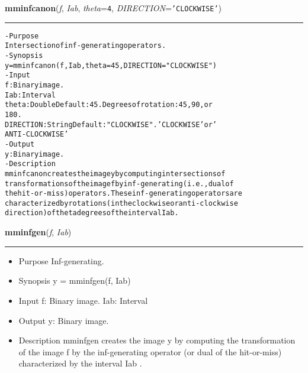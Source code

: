     \begin{boxedminipage}{\textwidth}

    \raggedright \textbf{mminfcanon}(\textit{f}, \textit{Iab}, \textit{theta}=\texttt{4\-}, \textit{DIRECTION}=\texttt{'\-C\-L\-O\-C\-K\-W\-I\-S\-E\-'\-})

    \vspace{-1.5ex}

    \rule{\textwidth}{0.5\fboxrule}
\begin{alltt}
- Purpose
    Intersection of inf-generating operators.
- Synopsis
    y = mminfcanon(f, Iab, theta=45, DIRECTION="CLOCKWISE")
- Input
    f:         Binary image.
    Iab:       Interval
    theta:     Double Default: 45. Degrees of rotation: 45, 90, or
               180.
    DIRECTION: String Default: "CLOCKWISE". 'CLOCKWISE' or '
               ANTI-CLOCKWISE'
- Output
    y: Binary image.
- Description
    mminfcanon creates the image y by computing intersections of
    transformations of the image f by inf-generating (i.e., dual of
    the hit-or-miss) operators. These inf-generating operators are
    characterized by rotations (in the clockwise or anti-clockwise
    direction) of theta degrees of the interval Iab .\end{alltt}

    \vspace{1ex}

    \end{boxedminipage}

    \label{multireg:num_pymorph:mminfgen}
    \vspace{0.5ex}

    \begin{boxedminipage}{\textwidth}

    \raggedright \textbf{mminfgen}(\textit{f}, \textit{Iab})

    \vspace{-1.5ex}

    \rule{\textwidth}{0.5\fboxrule}
    \begin{itemize}
    \setlength{\parskip}{0.6ex}
      \item Purpose Inf-generating.

      \item Synopsis y = mminfgen(f, Iab)

      \item Input f: Binary image. Iab: Interval

      \item Output y: Binary image.

      \item Description mminfgen creates the image y by computing the 
        transformation of the image f by the inf-generating operator (or 
        dual of the hit-or-miss) characterized by the interval Iab .

    \end{itemize}

    \vspace{1ex}

    \end{boxedminipage}

